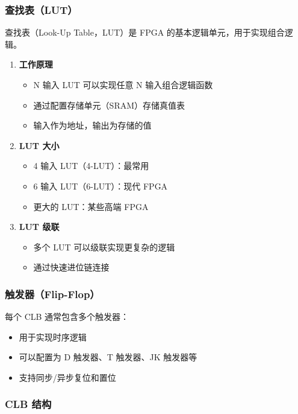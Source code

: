 \subsubsection{查找表（LUT）}

查找表（Look-Up Table，LUT）是 FPGA 的基本逻辑单元，用于实现组合逻辑。

\begin{enumerate}
  \item \textbf{工作原理}
    \begin{itemize}
      \item N 输入 LUT 可以实现任意 N 输入组合逻辑函数
      \item 通过配置存储单元（SRAM）存储真值表
      \item 输入作为地址，输出为存储的值
    \end{itemize}

  \item \textbf{LUT 大小}
    \begin{itemize}
      \item 4 输入 LUT（4-LUT）：最常用
      \item 6 输入 LUT（6-LUT）：现代 FPGA
      \item 更大的 LUT：某些高端 FPGA
    \end{itemize}

  \item \textbf{LUT 级联}
    \begin{itemize}
      \item 多个 LUT 可以级联实现更复杂的逻辑
      \item 通过快速进位链连接
    \end{itemize}
\end{enumerate}

\subsubsection{触发器（Flip-Flop）}

每个 CLB 通常包含多个触发器：
\begin{itemize}
  \item 用于实现时序逻辑
  \item 可以配置为 D 触发器、T 触发器、JK 触发器等
  \item 支持同步/异步复位和置位
\end{itemize}

\subsubsection{CLB 结构}

